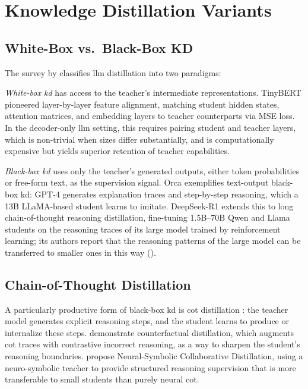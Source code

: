 
\section{Knowledge Distillation Variants}
\label{supp:kd}

\subsection{White-Box vs.\ Black-Box KD}

The survey by \citet{yang2024kd_survey} classifies \gls{llm} distillation into two paradigms:

\emph{White-box \gls{kd}} has access to the teacher's intermediate representations. TinyBERT \citep{jiao2020tinybert} pioneered layer-by-layer feature alignment, matching student hidden states, attention matrices, and embedding layers to teacher counterparts via MSE loss. In the decoder-only \gls{llm} setting, this requires pairing student and teacher layers, which is non-trivial when sizes differ substantially, and is computationally expensive but yields superior retention of teacher capabilities.

\emph{Black-box \gls{kd}} uses only the teacher's generated outputs, either token probabilities or free-form text, as the supervision signal. Orca \citep{mukherjee2023orca} exemplifies text-output black-box \gls{kd}: GPT-4 generates explanation traces and step-by-step reasoning, which a 13B LLaMA-based student learns to imitate. DeepSeek-R1 \citep{deepseek2025r1} extends this to long chain-of-thought reasoning distillation, fine-tuning 1.5B--70B Qwen and Llama students on the reasoning traces of its large model trained by reinforcement learning; its authors report that the reasoning patterns of the large model can be transferred to smaller ones in this way (\evC).

\subsection{Chain-of-Thought Distillation}

A particularly productive form of black-box \gls{kd} is \gls{cot} distillation \citep{wei2022cot}: the teacher model generates explicit reasoning steps, and the student learns to produce or internalize these steps. \citet{feng2024counterfactual} demonstrate counterfactual distillation, which augments \gls{cot} traces with contrastive incorrect reasoning, as a way to sharpen the student's reasoning boundaries. \citet{liao2024nesycd} propose Neural-Symbolic Collaborative Distillation, using a neuro-symbolic teacher to provide structured reasoning supervision that is more transferable to small students than purely neural \gls{cot}.

